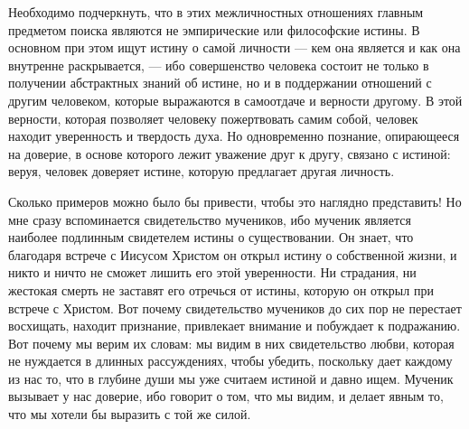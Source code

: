 \documentclass[a5paper,10pt]{article}
\begin{document}
Необходимо подчеркнуть, что в этих межличностных отношениях главным предметом
поиска являются не эмпирические или философские истины. В основном при этом
ищут истину о самой личности — кем она является и как она внутренне
раскрывается, — ибо совершенство человека состоит не только в получении
абстрактных знаний об истине, но и в поддержании отношений с другим человеком,
которые выражаются в самоотдаче и верности другому. В этой верности, которая
позволяет человеку пожертвовать самим собой, человек находит уверенность и
твердость духа. Но одновременно познание, опирающееся на доверие, в основе
которого лежит уважение друг к другу, связано с истиной: веруя, человек
доверяет истине, которую предлагает другая личность.

Сколько примеров можно было бы привести, чтобы это наглядно представить! Но мне
сразу вспоминается свидетельство мучеников, ибо мученик является наиболее
подлинным свидетелем истины о существовании. Он знает, что благодаря встрече с
Иисусом Христом он открыл истину о собственной жизни, и никто и ничто не сможет
лишить его этой уверенности. Ни страдания, ни жестокая смерть не заставят его
отречься от истины, которую он открыл при встрече с Христом. Вот почему
свидетельство мучеников до сих пор не перестает восхищать, находит признание,
привлекает внимание и побуждает к подражанию. Вот почему мы верим их словам: мы
видим в них свидетельство любви, которая не нуждается в длинных рассуждениях,
чтобы убедить, поскольку дает каждому из нас то, что в глубине души мы уже
считаем истиной и давно ищем. Мученик вызывает у нас доверие, ибо говорит о
том, что мы видим, и делает явным то, что мы хотели бы выразить с той же силой.
\end{document}
